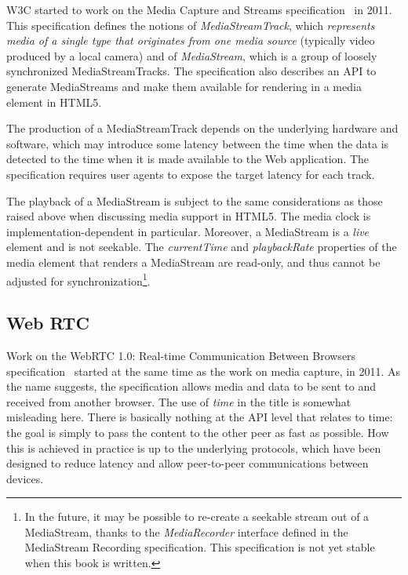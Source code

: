 W3C started to work on the Media Capture and Streams
specification~\cite{capture} in 2011. This specification defines the notions
of \emph{MediaStreamTrack}, which \emph{represents media of a single type that
originates from one media source} (typically video produced by a local camera)
and of \emph{MediaStream}, which is a group of loosely synchronized
MediaStreamTracks. The specification also describes an API to generate
MediaStreams and make them available for rendering in a media element in
HTML5.

The production of a MediaStreamTrack depends on the underlying hardware and
software, which may introduce some latency between the time when the data is
detected to the time when it is made available to the Web application. The
specification requires user agents to expose the target latency for each
track.

The playback of a MediaStream is subject to the same considerations as those
raised above when discussing media support in HTML5. The media clock is
implementation-dependent in particular. Moreover, a MediaStream is a
\emph{live} element and is not seekable. The \emph{currentTime} and
\emph{playbackRate} properties of the media element that renders a MediaStream
are read-only, and thus cannot be adjusted for synchronization\footnote{In the
future, it may be possible to re-create a seekable stream out of a
MediaStream, thanks to the \emph{MediaRecorder} interface defined in the
MediaStream Recording specification. This specification is not yet stable when
this book is written.}.


\subsection{Web RTC}
\label{sec:webrtc}

Work on the WebRTC 1.0: Real-time Communication Between Browsers
specification~\cite{webrtc}  started at the same time as the work on media
capture, in 2011. As the name suggests, the specification allows media and
data to be sent to and received from another browser. The use of \emph{time}
in the title is somewhat misleading here. There is basically nothing at the
API level that relates to time: the goal is simply to pass the content to the
other peer as fast as possible. How this is achieved in practice is up to the
underlying protocols, which have been designed to reduce latency and allow
peer-to-peer communications between devices.

